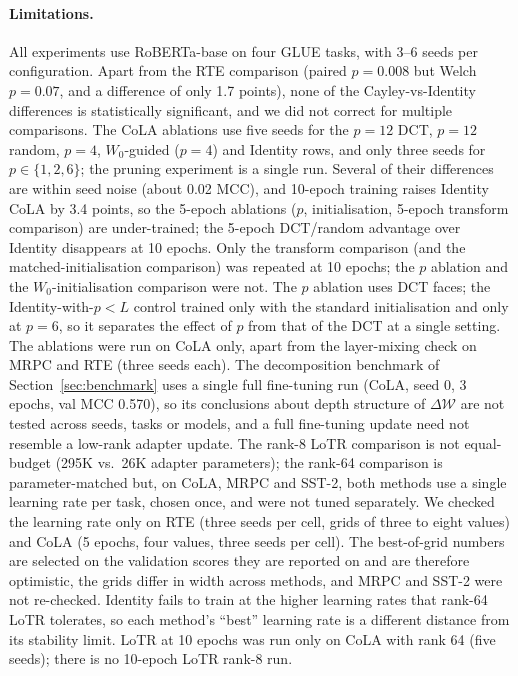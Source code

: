 \documentclass{article}
\newcommand{\DeltaW}{\Delta\mathcal{W}}
\theoremstyle{plain}
\begin{document}
\paragraph{Limitations.}
All experiments use RoBERTa-base on four GLUE tasks, with 3--6 seeds per configuration.
Apart from the RTE comparison (paired $p=0.008$ but Welch $p=0.07$, and a difference of only 1.7 points),
none of the Cayley-vs-Identity differences is statistically significant, and we did not correct for multiple comparisons.
The CoLA ablations use five seeds for the $p=12$ DCT, $p=12$ random, $p=4$, $W_0$-guided ($p=4$) and Identity rows,
and only three seeds for $p\in\{1,2,6\}$; the pruning experiment is a single run.
Several of their differences are within seed noise (about 0.02 MCC), and 10-epoch training raises Identity CoLA by 3.4 points, so the
5-epoch ablations ($p$, initialisation, 5-epoch transform comparison) are under-trained; the 5-epoch DCT/random advantage over Identity disappears at 10 epochs.
Only the transform comparison (and the matched-initialisation comparison) was repeated at 10 epochs; the $p$ ablation and the $W_0$-initialisation comparison were not.
The $p$ ablation uses DCT faces; the Identity-with-$p<L$ control trained only with the standard initialisation and only at $p=6$, so it separates the effect of $p$ from that of the DCT at a single setting.
The ablations were run on CoLA only, apart from the layer-mixing check on MRPC and RTE (three seeds each).
The decomposition benchmark of Section~\ref{sec:benchmark} uses a single full fine-tuning run
(CoLA, seed 0, 3 epochs, val MCC 0.570), so its conclusions about depth structure of $\DeltaW$ are not
tested across seeds, tasks or models, and a full fine-tuning update need not resemble a low-rank adapter update.
The rank-8 LoTR comparison is not equal-budget (295K vs.\ 26K adapter parameters); the rank-64 comparison is
parameter-matched but, on CoLA, MRPC and SST-2, both methods use a single learning rate per task, chosen once, and were not tuned separately.
We checked the learning rate only on RTE (three seeds per cell, grids of three to eight values) and CoLA (5 epochs, four values, three seeds per cell).
The best-of-grid numbers are selected on the validation scores they are reported on and are therefore optimistic,
the grids differ in width across methods, and MRPC and SST-2 were not re-checked.
Identity fails to train at the higher learning rates that rank-64 LoTR tolerates, so each method's ``best'' learning rate is a different distance from its stability limit.
LoTR at 10 epochs was run only on CoLA with rank 64 (five seeds); there is no 10-epoch LoTR rank-8 run.
\end{document}
